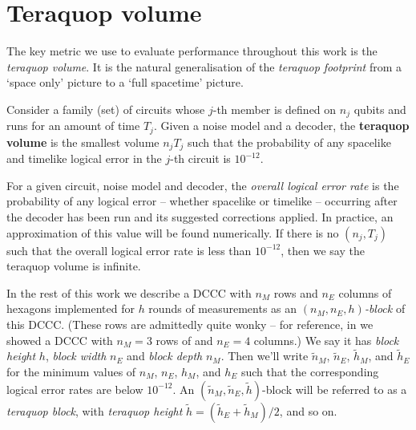 \chapter{Teraquop volume}\label{ch:teraquop-volume}

The key metric we use to evaluate performance throughout this work is the \textit{teraquop volume}.
It is the natural generalisation of the \emph{teraquop footprint} \cite{gidney2021fault} from a `space only' picture to a `full spacetime' picture.

\begin{definition}
    Consider a family (set) of circuits whose $j$-th member is defined on $n_j$ qubits and runs for an amount of time $T_j$.
    Given a noise model and a decoder,
    the \textbf{teraquop volume} is the smallest volume $n_j T_j$ such that the probability of any spacelike and timelike logical error in the $j$-th circuit is $10^{-12}$.
\end{definition}

For a given circuit, noise model and decoder, the \emph{overall logical error rate} is the probability of any logical error -- whether spacelike or timelike -- occurring after the decoder has been run and its suggested corrections applied.
In practice, an approximation of this value will be found numerically.
If there is no $(n_j, T_j)$ such that the overall logical error rate is less than $10^{-12}$,
then we say the teraquop volume is infinite.

In the rest of this work we describe a DCCC with $n_M$ rows and $n_E$ columns of hexagons implemented for $h$ rounds of measurements as an \textit{$(n_M, n_E, h)$-block} of this DCCC.
(These rows are admittedly quite wonky -- for reference, in  we showed a DCCC with $n_M = 3$ rows of and $n_E = 4$ columns.)
We say it has \textit{block height} $h$, \textit{block width} $n_E$ and \textit{block depth} $n_M$.
Then we'll write $\tilde{n}_M$, $\tilde{n}_E$, $\tilde{h}_M$, and $\tilde{h}_E$ for the minimum values of $n_M$, $n_E$, $h_M$, and $h_E$ such that the corresponding logical error rates are below $10^{-12}$.
An $(\tilde{n}_M, \tilde{n}_E, \tilde{h})$-block will be referred to as a \textit{teraquop block},
with \textit{teraquop height} $\tilde{h} = (\tilde{h}_E + \tilde{h}_M)/2$, and so on.